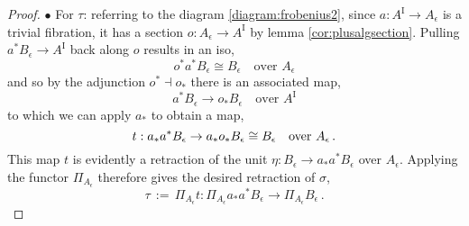 \documentclass[12pt]{article}
\newcommand{\ra}{\ensuremath{\rightarrow}}
\newcommand{\I}{\ensuremath{\mathrm{I}}}
\theoremstyle{remark}
\theoremstyle{definition}
\begin{document}
\begin{proof}
\noindent $\bullet$ For $\tau$: referring to the diagram \eqref{diagram:frobenius2}, since $a : A^\I \ra A_\epsilon$ is a trivial fibration, it has a section $o :  A_\epsilon \ra A^\I$ by lemma \ref{cor:plusalgsection}.  Pulling  $a^*B_\epsilon \ra A^\I$ back along $o$ results in an iso,
\[
o^*a^* B_\epsilon \cong B_\epsilon\quad\text{over $A_\epsilon$}
\]
and so by the adjunction $o^*\!\dashv o_*$ there is an associated map,
\[
a^* B_\epsilon \ra o_* B_\epsilon\quad\text{over $A^\I$}
\]
to which we can apply $a_*$ to obtain a map,
\[
t : a_*a^* B_\epsilon \ra a_*o_*B_\epsilon \cong B_\epsilon\quad \text{over $A_\epsilon$\,.}
\]
This map $t$ is evidently a retraction of the unit $\eta : B_\epsilon \ra a_*a^* B_\epsilon$ over $A_\epsilon$.  Applying the functor $ \Pi_{A_\epsilon}$ therefore gives the desired retraction  of $\sigma$, 
\[
\tau\, :=\, \Pi_{A_\epsilon}t :  \Pi_{A_\epsilon}a_*a^* B_\epsilon \ra \Pi_{A_\epsilon}B_\epsilon\,.
\]


\end{proof}
\end{document}
